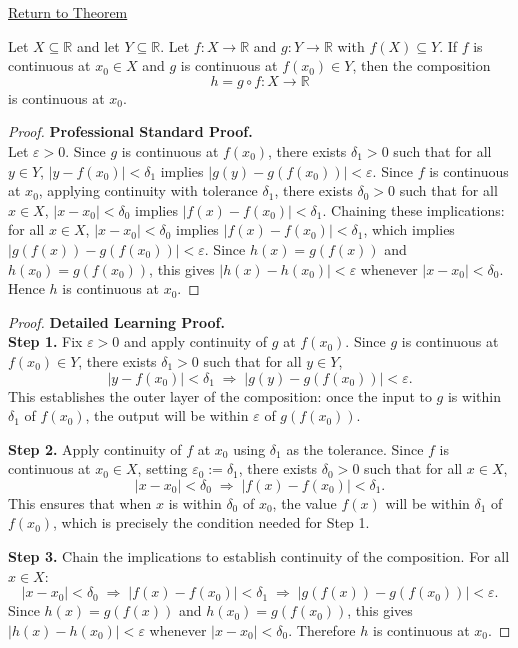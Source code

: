 \newpage
{}
\label{prf:composition-of-continuous-functions}

\begin{remark*}[Return]
\hyperref[thm:composition-of-continuous-functions]{Return to Theorem}
\end{remark*}

\begin{theorem*}
Let $X \subseteq \mathbb{R}$ and let $Y \subseteq \mathbb{R}$.
Let $f : X \to \mathbb{R}$ and $g : Y \to \mathbb{R}$ with $f(X)\subseteq Y$.
If $f$ is continuous at $x_0 \in X$ and $g$ is continuous at $f(x_0)\in Y$,
then the composition
\[
  h = g \circ f : X \to \mathbb{R}
\]
is continuous at $x_0$.
\end{theorem*}

\begin{proof}
\textbf{Professional Standard Proof.}~\\
Let $\varepsilon > 0$. Since $g$ is continuous at $f(x_0)$, there exists $\delta_1 > 0$ such that for all $y \in Y$, $|y - f(x_0)| < \delta_1$ implies $|g(y) - g(f(x_0))| < \varepsilon$. Since $f$ is continuous at $x_0$, applying continuity with tolerance $\delta_1$, there exists $\delta_0 > 0$ such that for all $x \in X$, $|x - x_0| < \delta_0$ implies $|f(x) - f(x_0)| < \delta_1$. Chaining these implications: for all $x \in X$, $|x - x_0| < \delta_0$ implies $|f(x) - f(x_0)| < \delta_1$, which implies $|g(f(x)) - g(f(x_0))| < \varepsilon$. Since $h(x) = g(f(x))$ and $h(x_0) = g(f(x_0))$, this gives $|h(x) - h(x_0)| < \varepsilon$ whenever $|x - x_0| < \delta_0$. Hence $h$ is continuous at $x_0$.
\end{proof}

\begin{proof}
\textbf{Detailed Learning Proof.}~\\

\textbf{Step 1.} Fix $\varepsilon > 0$ and apply continuity of $g$ at $f(x_0)$. Since $g$ is continuous at $f(x_0) \in Y$, there exists $\delta_1 > 0$ such that for all $y \in Y$,
\[
  |y - f(x_0)| < \delta_1 \;\Rightarrow\; |g(y) - g(f(x_0))| < \varepsilon.
\]
This establishes the outer layer of the composition: once the input to $g$ is within $\delta_1$ of $f(x_0)$, the output will be within $\varepsilon$ of $g(f(x_0))$.

\textbf{Step 2.} Apply continuity of $f$ at $x_0$ using $\delta_1$ as the tolerance. Since $f$ is continuous at $x_0 \in X$, setting $\varepsilon_0 := \delta_1$, there exists $\delta_0 > 0$ such that for all $x \in X$,
\[
  |x - x_0| < \delta_0 \;\Rightarrow\; |f(x) - f(x_0)| < \delta_1.
\]
This ensures that when $x$ is within $\delta_0$ of $x_0$, the value $f(x)$ will be within $\delta_1$ of $f(x_0)$, which is precisely the condition needed for Step 1.

\textbf{Step 3.} Chain the implications to establish continuity of the composition. For all $x \in X$:
\[
  |x - x_0| < \delta_0
  \;\Rightarrow\; |f(x) - f(x_0)| < \delta_1
  \;\Rightarrow\; |g(f(x)) - g(f(x_0))| < \varepsilon.
\]
Since $h(x) = g(f(x))$ and $h(x_0) = g(f(x_0))$, this gives $|h(x) - h(x_0)| < \varepsilon$ whenever $|x - x_0| < \delta_0$. Therefore $h$ is continuous at $x_0$.
\end{proof}

